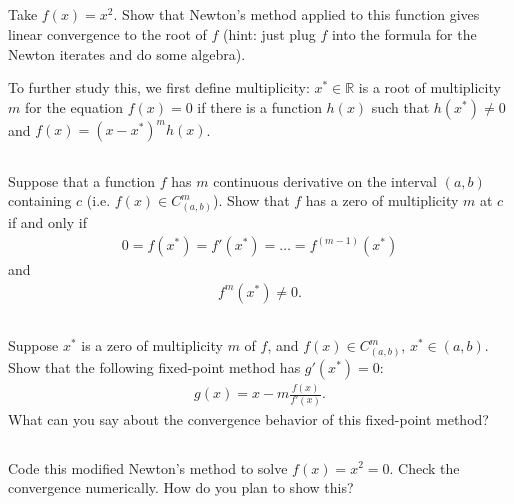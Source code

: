 \documentclass[11pt,letterpaper]{article}
\begin{document}
\subsection{}
Take $f(x) = x^2$. Show that Newton’s method applied to this function gives linear convergence to the root of $f$ (hint: just plug $f$ into the formula for the Newton iterates and do some algebra). 

To further study this, we first define multiplicity: $x^*\in \mathbb{R}$ is a root of multiplicity $m$ for the equation $f(x)=0$ if there is a function $h(x)$ such that $h(x^*)\neq 0$ and $f(x) = (x-x^*)^m h(x)$.

\subsection{}
Suppose that a function $f$ has $m$ continuous derivative on the interval $(a,b)$ containing $c$ (i.e. $f(x)\in C^m_{(a,b)}$). Show that $f$ has a zero of multiplicity $m$ at $c$ if and only if
\begin{align*}
    0 = f(x^*) = f'(x^*) = \dots = f^{(m-1)}(x^*)
\end{align*}
and
\begin{align*}
    f^{m}(x^*) \neq 0.
\end{align*}

\subsection{}
Suppose $x^*$ is a zero of multiplicity $m$ of $f$, and $f(x)\in C^m_{(a,b)}$, $x^*\in (a,b)$. Show that the following fixed-point method has $g'(x^*) = 0$:
\begin{align*}
    g(x) = x-m\frac{f(x)}{f'(x)}.
\end{align*}
What can you say about the convergence behavior of this fixed-point method?

\subsection{}
Code this modified Newton's method to solve $f(x) = x^2 = 0$. Check the convergence numerically. How do you plan to show this?
    
    
% 
% 
\end{document}
